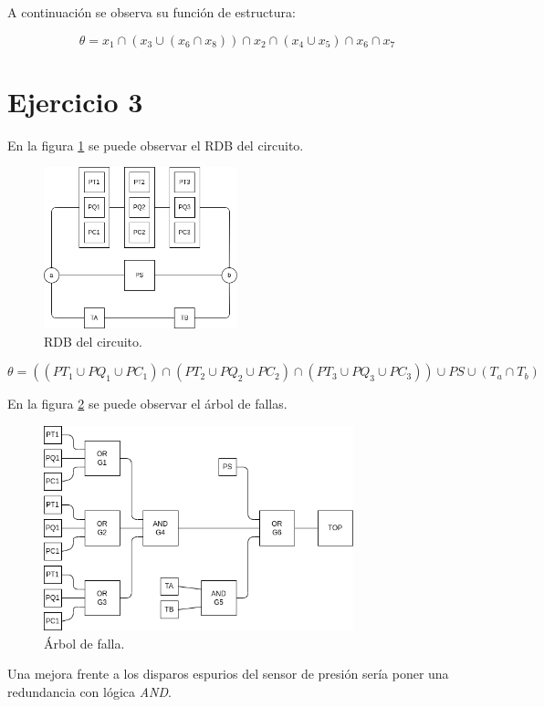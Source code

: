 \documentclass[
    11pt,
    spanish,
    a4paper
]{article}
\begin{document}
A continuación se observa su función de estructura:

\begin{dmath}
	\theta = x_1 \cap (x_3 \cup (x_6 \cap x_8) ) \cap x_2 \cap (x_4 \cup x_5) \cap x_6 \cap x_7
\end{dmath}

\newpage

\section{Ejercicio 3}

En la figura \ref{fig:rdbcreado} se puede observar el RDB del circuito.

\begin{figure}[htbp]
	\centering
	\includegraphics[width=0.5\textwidth]{img/rdb3.png}
	\caption{RDB del circuito.}
	\label{fig:rdbcreado}
\end{figure}

$$ \theta = ((PT_1 \cup PQ_1 \cup PC_1) \cap (PT_2 \cup PQ_2 \cup PC_2) \cap (PT_3 \cup PQ_3 \cup PC_3)) \cup PS \cup (T_a \cap T_b) $$

En la figura \ref{fig:arbol} se puede observar el árbol de fallas.

\begin{figure}[htbp]
	\centering
	\includegraphics[width=0.8\textwidth]{img/arbol.png}
	\caption{Árbol de falla.}
	\label{fig:arbol}
\end{figure}

Una mejora frente a los disparos espurios del sensor de presión sería poner una redundancia con lógica \emph{AND}.
\end{document}
